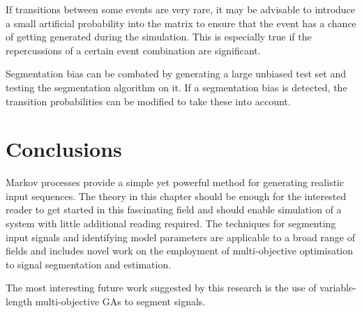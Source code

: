 If transitions between some events are very rare, it may be advisable
to introduce a small artificial probability into the matrix to ensure
that the event has a chance of  getting generated during the
simulation.  This is especially true if the repercussions of a certain
event combination are significant.  

Segmentation bias can be combated by generating a large unbiased test
set and testing the segmentation algorithm on it.  If a segmentation
bias is detected, the transition probabilities can be modified to take
these into account.




\section{Conclusions}
Markov processes provide a simple yet powerful method for generating
realistic input sequences.  The theory in this chapter should be
enough for the interested reader to get started in this fascinating
field and should enable simulation of a system with little additional
reading required.  The techniques for segmenting input signals and
identifying model parameters are applicable to a broad range of fields
and includes novel work on the employment of multi-objective
optimisation to signal segmentation and estimation.

The most interesting future work suggested by this research is the use
of variable-length multi-objective GAs to segment signals.



